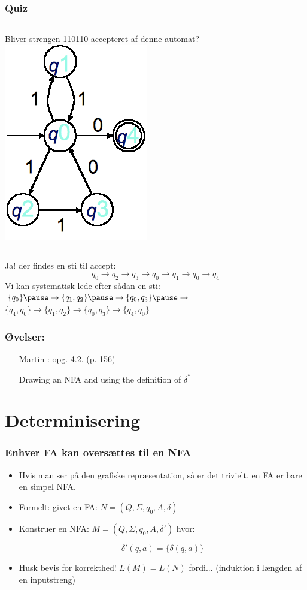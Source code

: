 \begin{frame}
\frametitle{Quiz}
\begin{columns}
\column{5cm} Bliver strengen 110110 accepteret af denne automat?
\column{5cm}
\includegraphics[scale=0.4]{images/2_seminar_quiz_NFA}
\end{columns}
\pause
Ja! der findes en sti til accept:
\[
q_0 \rightarrow q_2 \rightarrow q_3 \rightarrow q_0 \rightarrow q_1 \rightarrow q_0 \rightarrow q_4
\]
\pause
Vi kan systematisk lede efter sådan en sti:
$\{q_0\} \pause \rightarrow \{q_1, q_2\} \pause \rightarrow 
\{q_0, q_3\} \pause \rightarrow $\\
$\{q_4, q_0\} \rightarrow \{q_1, q_2\} \rightarrow \{q_0, q_3\} \rightarrow 
\{q_4, q_0\} 
$
\end{frame}
\begin{frame}
\frametitle{Øvelser:}
\begin{itemize}
\item [Martin]: opg. 4.2. (p. 156)

Drawing an NFA and using the definition of $\delta^*$
\end{itemize}
\end{frame}

\section{Determinisering}
\begin{frame}
\frametitle{Enhver FA kan oversættes til en NFA}
\begin{itemize}[<+->]
\item Hvis man ser på den grafiske repræsentation, så er det trivielt,
  en FA er bare en simpel NFA.
\item Formelt: givet en FA: $N=(Q, \Sigma, q_0, A, \delta)$
\item Konstruer en NFA: $M=(Q, \Sigma, q_0, A, \delta')$ hvor:
  
\[\delta'(q,a) = \{\delta(q,a)\}\]
\item Husk bevis for korrekthed! $L(M)=L(N)$ fordi... (induktion i længden af en inputstreng)
\end{itemize}
\end{frame}

